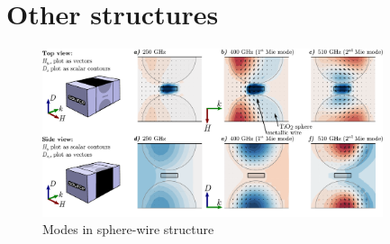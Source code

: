 \section{Other structures} %
\begin{figure} \caption{Modes in sphere-wire structure}  \centering \includegraphics[width=10cm]{img/new/modes_Mag_and_El.pdf} \end{figure} \clearpage


